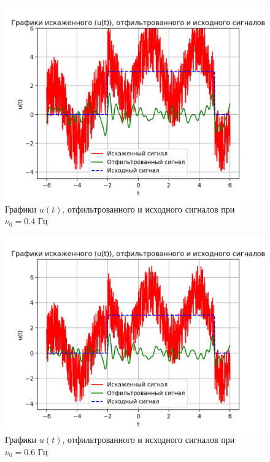 \begin{figure}[ht!]
    \centering
    \includegraphics[scale=0.75]{media/1 task/low_freq/Cleaned_4_2_2_-0,4.png}
    \caption{Графики  $u(t)$, отфильтрованного и исходного сигналов при $\nu_0=0.4$ Гц}
    \label{fig:cleaned_4_2_2_0.4}
\end{figure}

\clearpage

\begin{figure}[ht!]
    \centering
    \includegraphics[scale=0.75]{media/1 task/low_freq/Cleaned_4_2_2_-0,5975975975975976.png}
    \caption{Графики  $u(t)$, отфильтрованного и исходного сигналов при $\nu_0=0.6$ Гц}
    \label{fig:cleaned_4_2_2_0.6}
\end{figure}

